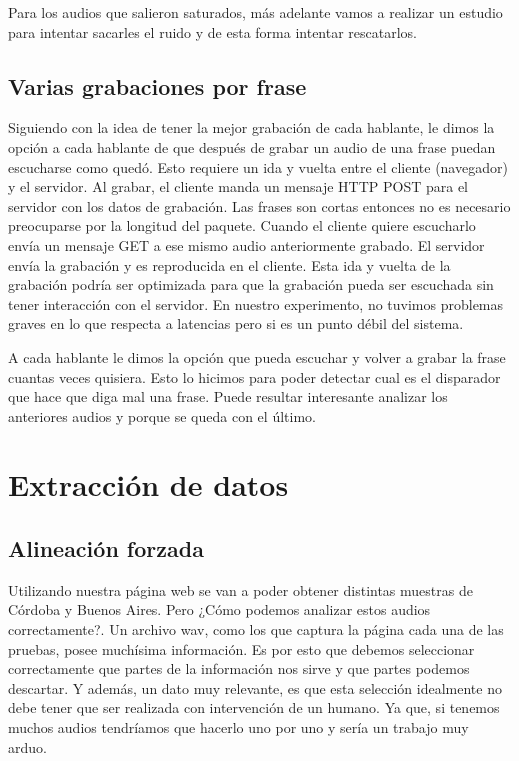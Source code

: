 \documentclass[11pt,a4paper,twoside]{tesis}
\begin{document}
Para los audios que salieron saturados, más adelante vamos a realizar un estudio para intentar sacarles el ruido y de esta forma intentar rescatarlos.

\section{Varias grabaciones por frase}

Siguiendo con la idea de tener la mejor grabación de cada hablante, le dimos la opción a cada hablante de que después de grabar un audio de una frase puedan escucharse como quedó. Esto requiere un ida y vuelta entre el cliente (navegador) y el servidor. Al grabar, el cliente manda un mensaje HTTP POST para el servidor con los datos de grabación. Las frases son cortas entonces no es necesario preocuparse por la longitud del paquete. Cuando el cliente quiere escucharlo envía un mensaje GET a ese mismo audio anteriormente grabado. El servidor envía la grabación y es reproducida en el cliente. Esta ida y vuelta de la grabación podría ser optimizada para que la grabación pueda ser escuchada sin tener interacción con el servidor. En nuestro experimento, no tuvimos problemas graves en lo que respecta a latencias pero si es un punto débil del sistema.

A cada hablante le dimos la opción que pueda escuchar y volver a grabar la frase cuantas veces quisiera. Esto lo hicimos para poder detectar cual es el disparador que hace que diga mal una frase. Puede resultar interesante analizar los anteriores audios y porque se queda con el último.

\chapter{Extracción de datos}

\section{Alineación forzada}

Utilizando nuestra página web se van a poder obtener distintas muestras de Córdoba y Buenos Aires. Pero ¿Cómo podemos analizar estos audios correctamente?. Un archivo wav, como los que captura la página cada una de las pruebas, posee muchísima información. Es por esto que debemos seleccionar correctamente que partes de la información nos sirve y que partes podemos descartar. Y además, un dato muy relevante, es que esta selección idealmente no debe tener que ser realizada con intervención de un humano. Ya que, si tenemos muchos audios tendríamos que hacerlo uno por uno y sería un trabajo muy arduo.
\end{document}
